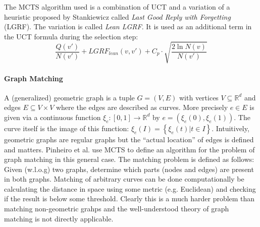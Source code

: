 The MCTS algorithm used is a combination of UCT and a variation of a heuristic proposed by Stankiewicz \cite{stankiewicz2011monte} called \textit{Last Good Reply with Forgetting} (LGRF). The variation is called \textit{Lean LGRF}. It is used as an additional term in the UCT formula during the selection step:
\begin{equation*}
    \frac{Q(v')}{N(v')}+ LGRF_{lean}(v,v')+C_p \cdot \sqrt{\frac{2 \ln N(v)}{N(v')}}
\end{equation*}
\paragraph{Graph Matching} A (generalized) geometric graph is a tuple $G=(V,E)$ with vertices $V\subseteq \mathbb{R}^d$ and edges $E \subseteq V \times V$ where the edges are described as curves. More precisely $e \in E$ is given via a continuous function $\xi_e: [0,1] \rightarrow \mathbb{R}^d$ by $e=(\xi_e(0),\xi_e(1))$. The curve itself is the image of this function: $\xi_e(I) = \left\{\xi_e(t) | t \in I \right\}$. Intuitively, geometric graphs are regular graphs but the \enquote{actual location} of edges is defined and matters. Pinheiro et al. \cite{pinheiro2016geometric} use MCTS to define an algorithm for the problem of graph matching in this general case. The matching problem is defined as follows: Given (w.l.o.g) two graphs, determine which parts (nodes and edges) are present in both graphs. Matching of arbitrary curves can be done computationally be calculating the distance in space using some metric (e.g. Euclidean) and checking if the result is below some threshold. Clearly this is a much harder problem than matching non-geometric grahps and the well-understood theory of graph matching is not directly applicable.

